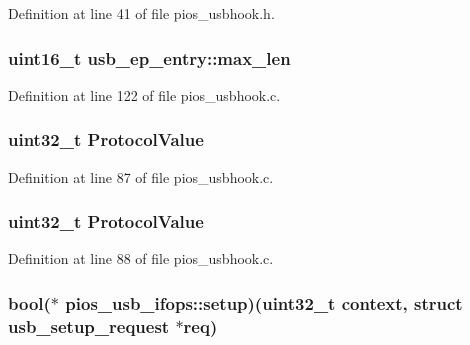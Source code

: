 \-Definition at line 41 of file pios\-\_\-usbhook.\-h.

\hypertarget{group___p_i_o_s___u_s_b_h_o_o_k_ga010957cf5bf2628ba64249b8c1271f91}{
\subsubsection[{max\-\_\-len}]{\setlength{\rightskip}{0pt plus 5cm}uint16\-\_\-t {\bf usb\-\_\-ep\-\_\-entry\-::max\-\_\-len}}}\label{group___p_i_o_s___u_s_b_h_o_o_k_ga010957cf5bf2628ba64249b8c1271f91}


\-Definition at line 122 of file pios\-\_\-usbhook.\-c.

\hypertarget{group___p_i_o_s___u_s_b_h_o_o_k_ga271c451896dad2b849277faad3eb3ea6}{
\subsubsection[{\-Protocol\-Value}]{\setlength{\rightskip}{0pt plus 5cm}uint32\-\_\-t {\bf \-Protocol\-Value}}}\label{group___p_i_o_s___u_s_b_h_o_o_k_ga271c451896dad2b849277faad3eb3ea6}


\-Definition at line 87 of file pios\-\_\-usbhook.\-c.

\hypertarget{group___p_i_o_s___u_s_b_h_o_o_k_ga271c451896dad2b849277faad3eb3ea6}{
\subsubsection[{\-Protocol\-Value}]{\setlength{\rightskip}{0pt plus 5cm}uint32\-\_\-t {\bf \-Protocol\-Value}}}\label{group___p_i_o_s___u_s_b_h_o_o_k_ga271c451896dad2b849277faad3eb3ea6}


\-Definition at line 88 of file pios\-\_\-usbhook.\-c.

\hypertarget{group___p_i_o_s___u_s_b_h_o_o_k_gafc58e776c6ff79a3974ca6dc1decf467}{
\subsubsection[{setup}]{\setlength{\rightskip}{0pt plus 5cm}bool($\ast$ {\bf pios\-\_\-usb\-\_\-ifops\-::setup})(uint32\-\_\-t context, struct {\bf usb\-\_\-setup\-\_\-request} $\ast$req)}}\label{group___p_i_o_s___u_s_b_h_o_o_k_gafc58e776c6ff79a3974ca6dc1decf467}


